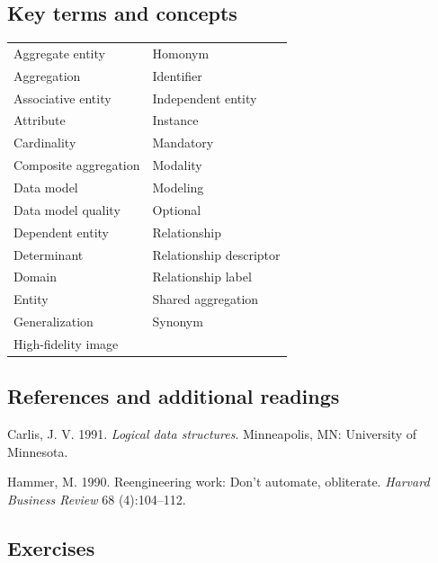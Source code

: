 \documentclass[
]{article}
\begin{document}
\hypertarget{key-terms-and-concepts-4}{%
\subsection*{Key terms and concepts}\label{key-terms-and-concepts-4}}

\begin{longtable}[]{@{}ll@{}}
\toprule
& \\
\midrule
\endhead
Aggregate entity & Homonym \\
Aggregation & Identifier \\
Associative entity & Independent entity \\
Attribute & Instance \\
Cardinality & Mandatory \\
Composite aggregation & Modality \\
Data model & Modeling \\
Data model quality & Optional \\
Dependent entity & Relationship \\
Determinant & Relationship descriptor \\
Domain & Relationship label \\
Entity & Shared aggregation \\
Generalization & Synonym \\
High-fidelity image & \\
\bottomrule
\end{longtable}

\hypertarget{references-and-additional-readings-2}{%
\subsection*{References and additional readings}\label{references-and-additional-readings-2}}

Carlis, J. V. 1991. \emph{Logical data structures}. Minneapolis, MN:
University of Minnesota.

Hammer, M. 1990. Reengineering work: Don't automate, obliterate.
\emph{Harvard Business Review} 68 (4):104--112.

\hypertarget{exercises-5}{%
\subsection*{Exercises}\label{exercises-5}}
\end{document}
